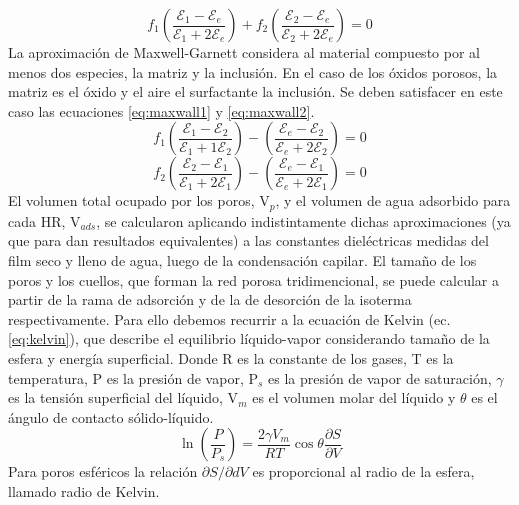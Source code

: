 								\begin{equation}
					 		   	 f_1\left(\frac{\mathcal{E}_1-\mathcal{E}_e}{\mathcal{E}_1+2\mathcal{E}_e}\right)+
					 		   	 f_2\left(\frac{\mathcal{E}_2-\mathcal{E}_e}{\mathcal{E}_2+2\mathcal{E}_e}\right)=0
					 		     \label{eq:bruggeman}
								\end{equation}
		La aproximación de Maxwell-Garnett considera al material compuesto por al menos dos especies, la matriz y la inclusión. En el caso de los óxidos porosos, la matriz es el óxido y el aire el surfactante la inclusión. Se deben satisfacer en este caso las ecuaciones \ref{eq:maxwall1} y \ref{eq:maxwall2}.
							\begin{equation}
					 		   	 f_1\left(\frac{\mathcal{E}_1-\mathcal{E}_2}{\mathcal{E}_1+1\mathcal{E}_2}\right)-
					 		   	 \left(\frac{\mathcal{E}_e-\mathcal{E}_2}{\mathcal{E}_e+2\mathcal{E}_2}\right)=0
					 		     \label{eq:maxwall1}
								\end{equation}
								\begin{equation}
					 		   	 f_2\left(\frac{\mathcal{E}_2-\mathcal{E}_1}{\mathcal{E}_1+2\mathcal{E}_1}\right)-
					 		   	 \left(\frac{\mathcal{E}_e-\mathcal{E}_1}{\mathcal{E}_e+2\mathcal{E}_1}\right)=0
					 		     \label{eq:maxwall2}
								\end{equation}
		El volumen total ocupado por los poros, V$_p$, y el volumen de agua adsorbido para cada HR, V$_{ads}$, se calcularon aplicando indistintamente dichas aproximaciones (ya que para \pdm\space dan resultados equivalentes) a las constantes dieléctricas medidas del film seco y lleno de agua, luego de la condensación capilar.\cite{Angelome2008,Fuertes2009,Nano-compuestas2013}
		El tamaño de los poros y los cuellos, que forman la red porosa tridimencional, se puede calcular a partir de la rama de adsorción y de la de desorción de la isoterma respectivamente. Para ello debemos recurrir a la ecuación de Kelvin (ec. \ref{eq:kelvin}), que describe el equilibrio líquido-vapor considerando tamaño de la esfera y energía superficial. Donde R es la constante de los gases, T es la temperatura, P es la presión de vapor, P$_s$ es la presión de vapor de saturación, $\gamma$ es la tensión superficial del líquido, V$_m$ es el volumen molar del líquido y $\theta$ es el ángulo de contacto sólido-líquido. 
								\begin{equation}
					 		   	 \ln \left(\frac{P}{P_s}\right)=\frac{2\gamma V_m}{RT} \cos{\theta}\frac{\partial S}{\partial V}
					 		     \label{eq:kelvin}
								\end{equation}			
		Para poros esféricos la relación $\partial S/ \partial dV$ es proporcional al radio de la esfera, llamado radio de Kelvin.\cite{FernandezPrini2005}

